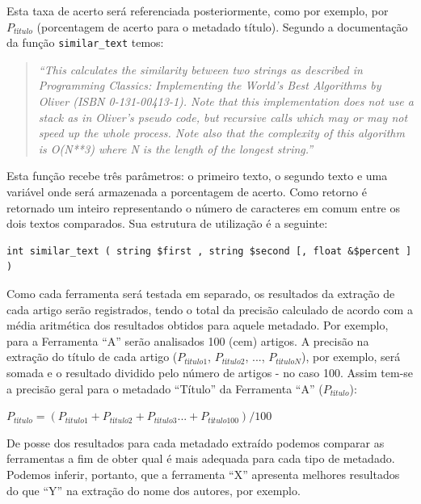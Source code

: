 Esta taxa de acerto será referenciada posteriormente, como por exemplo, por $P_{título}$ (porcentagem de acerto para o metadado título). Segundo a documentação da função \texttt{similar\_text} temos:

\begin{quote}
    \emph{``This calculates the similarity between two strings as described in Programming Classics: Implementing the World's Best Algorithms by Oliver (ISBN 0-131-00413-1). Note that this implementation does not use a stack as in Oliver's pseudo code, but recursive calls which may or may not speed up the whole process. Note also that the complexity of this algorithm is O(N**3) where N is the length of the longest string.''}
\end{quote}

Esta função recebe três parâmetros: o primeiro texto, o segundo texto e uma variável onde será armazenada a porcentagem de acerto. Como retorno é retornado um inteiro representando o número de caracteres em comum entre os dois textos comparados. Sua estrutura de utilização é a seguinte:

\lstset{language=PHP}
\begin{lstlisting}[escapechar=\#]
int similar_text ( string $first , string $second [, float &$percent ] )
\end{lstlisting}

Como cada ferramenta será testada em separado, os resultados da extração de cada artigo serão registrados, tendo o total da precisão calculado de acordo com a média aritmética dos resultados obtidos para aquele metadado. Por exemplo, para a Ferramenta ``A'' serão analisados 100 (cem) artigos. A precisão na extração do título de cada artigo ($P_{título1}$, $P_{título2}$, ..., $P_{títuloN}$), por exemplo, será somada e o resultado dividido pelo número de artigos - no caso 100. Assim tem-se a precisão geral para o metadado ``Título'' da Ferramenta ``A'' ($P_{título}$):

\begin{center}
    \begin{math}
        P_{título} = (P_{título1} + P_{título2} + P_{título3} ... + P_{título100}) / 100
        \label{math:result-by-metadata}
    \end{math}
\end{center}

De posse dos resultados para cada metadado extraído podemos comparar as ferramentas a fim de obter qual é mais adequada para cada tipo de metadado. Podemos inferir, portanto, que a ferramenta ``X'' apresenta melhores resultados do que ``Y'' na extração do nome dos autores, por exemplo.

